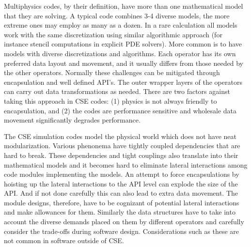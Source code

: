 \label{sec:domainChallenges}
Multiphysics codes, by their definition, have more than one
mathematical model that they are solving. A typical code combines 3-4
diverse models, the more extreme ones may employ as many as a
dozen. In a rare calculation all models work with the same
discretization using similar algorithmic approach (for instance
stencil computations in explicit PDE solvers). More common is to have
models with diverse discretizations and algorithms. Each operator has
its own preferred data layout and  movement, and it usually differs
from those needed by the other operators.  Normally these challenges
can be mitigated through encapsulation and well defined API's. The outer
wrapper layers of the operators can carry out data transformations as
needed. There are two factors against taking this approach in CSE
codes: (1) physics is not always friendly to encapsulation, and (2)
the codes are performance sensitive and wholesale data movement
significantly degrades performance. 

The CSE simulation codes model the physical world which does not
have neat modularization. Various phenonema have tightly coupled
dependencies that are hard to break. These dependencies and tight
couplings also translate into their mathematical models and it becomes
hard to eliminate lateral interactions among code modules implementing
the models. An attempt to force encapsulations by hoisting up the
lateral interactions to the API level can explode the size of the
API. And if not done carefully this can also lead to extra data
movement. The module designs, therefore, have to be cognizant of
potential lateral interactions and make allowances for them.
Similarly the data structures have to take into account the diverse
demands placed on them by different operators and carefully consider
the trade-offs during software design. Considerations such as these
are not common in software outside of CSE.  



